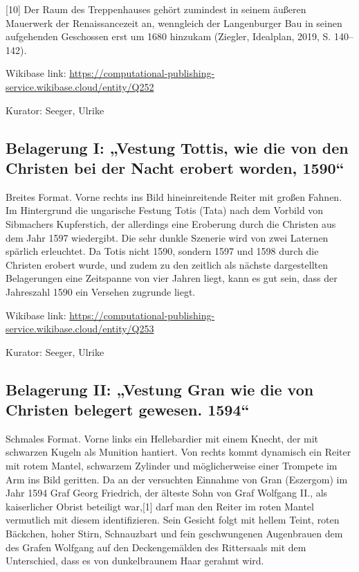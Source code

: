 \documentclass[
  letterpaper,
]{book}
\begin{document}
{[}10{]} Der Raum des Treppenhauses gehört zumindest in seinem äußeren
Mauerwerk der Renaissancezeit an, wenngleich der Langenburger Bau in
seinen aufgehenden Geschossen erst um 1680 hinzukam (Ziegler, Idealplan,
2019, S. 140--142).

Wikibase link:
\url{https://computational-publishing-service.wikibase.cloud/entity/Q252}

Kurator: Seeger, Ulrike

\subsection{Belagerung I: „Vestung Tottis, wie die von den Christen bei
der Nacht erobert worden,
1590``}\label{belagerung-i-vestung-tottis-wie-die-von-den-christen-bei-der-nacht-erobert-worden-1590}

Breites Format. Vorne rechts ins Bild hineinreitende Reiter mit großen
Fahnen. Im Hintergrund die ungarische Festung Totis (Tata) nach dem
Vorbild von Sibmachers Kupferstich, der allerdings eine Eroberung durch
die Christen aus dem Jahr 1597 wiedergibt. Die sehr dunkle Szenerie wird
von zwei Laternen spärlich erleuchtet. Da Totis nicht 1590, sondern 1597
und 1598 durch die Christen erobert wurde, und zudem zu den zeitlich als
nächste dargestellten Belagerungen eine Zeitspanne von vier Jahren
liegt, kann es gut sein, dass der Jahreszahl 1590 ein Versehen zugrunde
liegt.

Wikibase link:
\url{https://computational-publishing-service.wikibase.cloud/entity/Q253}

Kurator: Seeger, Ulrike

\subsection{Belagerung II: „Vestung Gran wie die von Christen belegert
gewesen.
1594``}\label{belagerung-ii-vestung-gran-wie-die-von-christen-belegert-gewesen.-1594}

Schmales Format. Vorne links ein Hellebardier mit einem Knecht, der mit
schwarzen Kugeln als Munition hantiert. Von rechts kommt dynamisch ein
Reiter mit rotem Mantel, schwarzem Zylinder und möglicherweise einer
Trompete im Arm ins Bild geritten. Da an der versuchten Einnahme von
Gran (Eszergom) im Jahr 1594 Graf Georg Friedrich, der älteste Sohn von
Graf Wolfgang II., als kaiserlicher Obrist beteiligt war,{[}1{]} darf
man den Reiter im roten Mantel vermutlich mit diesem identifizieren.
Sein Gesicht folgt mit hellem Teint, roten Bäckchen, hoher Stirn,
Schnauzbart und fein geschwungenen Augenbrauen dem des Grafen Wolfgang
auf den Deckengemälden des Rittersaals mit dem Unterschied, dass es von
dunkelbraunem Haar gerahmt wird.
\end{document}
